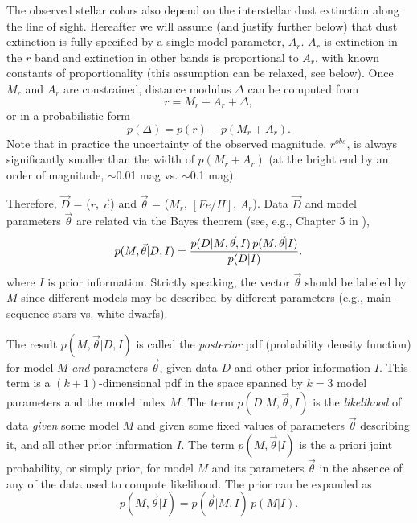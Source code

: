 The observed stellar colors also depend on the interstellar dust extinction along the line of sight. Hereafter
we will assume (and justify further below) that dust extinction is fully specified by a single model parameter, $A_r$.
$A_r$ is extinction in the $r$ band and extinction in other bands is proportional to $A_r$, with known constants
of proportionality (this assumption can be relaxed, see below). Once $M_r$ and $A_r$ are constrained, distance
modulus $\Delta$ can be computed from
\begin{equation}
  \label{eq:distmod}
                   r = M_r + A_r + \Delta,
\end{equation}
or in a probabilistic form
\begin{equation}
  \label{eq:distmodpdf}
                       p(\Delta) = p(r) - p(M_r + A_r). 
\end{equation}
Note that in practice the uncertainty of the observed magnitude, $r^{obs}$, is always significantly smaller than
the width of $p(M_r + A_r)$ (at the bright end by an order of magnitude, $\sim$0.01 mag vs. $\sim$0.1 mag). 

Therefore, $\vec{D}$ = ($r$, $\vec{c}$) and $\vec{\theta}$ = ($M_r$, $[Fe/H]$, $A_r$). Data $\vec{D}$ and
model parameters $\vec{\theta}$ are related via the Bayes theorem (see, e.g., Chapter 5 in \citealt{2020sdmm.book.....I}),
\begin{equation}
  \label{eq:BayesFull}
         p(M,\vec{\theta}|D,I) = {  p(D|M,\vec{\theta},I) \, p(M,\vec{\theta}|I) \over p(D|I)}.
\end{equation}
where $I$ is prior information. Strictly speaking, the vector $\vec{\theta}$
should be labeled by $M$ since different models may be described by different parameters (e.g., main-sequence
stars vs. white dwarfs).  

The result $p(M,\vec{\theta}|D,I)$ is called the {\it posterior} pdf (probability density function) for model $M$ {\it and}
parameters $\vec{\theta}$, given data $D$ and other prior information $I$. This term is a $(k+1)$-dimensional
pdf in the space spanned by $k=3$ model parameters and the model index $M$. The term $p(D|M,\vec{\theta},I)$
is the {\it likelihood} of data {\it given} some model $M$ and given some fixed values of
parameters $\vec{\theta}$ describing it, and all other prior information $I$. The term $p(M,\vec{\theta}|I)$
is the a priori joint probability, or simply prior, for model $M$ and its parameters $\vec{\theta}$ in the absence of any
of the data used to compute likelihood. The prior can be expanded as
\begin{equation}
 \label{eq:BayesPriorExpand}
        p(M,\vec{\theta}|I) = p(\vec{\theta}|M,I) \,p(M|I).
\end{equation}

